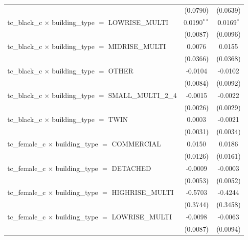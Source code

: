 \begin{tabular}{lcc}
                                                                       & (0.0790)       & (0.0639)\\   
   tc\_black\_c $\times$ building\_type $=$ LOWRISE\_MULTI             & 0.0190$^{**}$  & 0.0169$^{*}$\\   
                                                                       & (0.0087)       & (0.0096)\\   
   tc\_black\_c $\times$ building\_type $=$ MIDRISE\_MULTI             & 0.0076         & 0.0155\\   
                                                                       & (0.0366)       & (0.0368)\\   
   tc\_black\_c $\times$ building\_type $=$ OTHER                      & -0.0104        & -0.0102\\   
                                                                       & (0.0084)       & (0.0092)\\   
   tc\_black\_c $\times$ building\_type $=$ SMALL\_MULTI\_2\_4         & -0.0015        & -0.0022\\   
                                                                       & (0.0026)       & (0.0029)\\   
   tc\_black\_c $\times$ building\_type $=$ TWIN                       & 0.0003         & -0.0021\\   
                                                                       & (0.0031)       & (0.0034)\\   
   tc\_female\_c $\times$ building\_type $=$ COMMERCIAL                & 0.0150         & 0.0186\\   
                                                                       & (0.0126)       & (0.0161)\\   
   tc\_female\_c $\times$ building\_type $=$ DETACHED                  & -0.0009        & -0.0003\\   
                                                                       & (0.0053)       & (0.0052)\\   
   tc\_female\_c $\times$ building\_type $=$ HIGHRISE\_MULTI           & -0.5703        & -0.4244\\   
                                                                       & (0.3744)       & (0.3458)\\   
   tc\_female\_c $\times$ building\_type $=$ LOWRISE\_MULTI            & -0.0098        & -0.0063\\   
                                                                       & (0.0087)       & (0.0094)\\   

\end{tabular}
